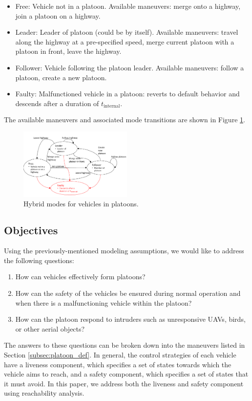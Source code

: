 \begin{itemize}
\item Free: Vehicle not in a platoon. Available maneuvers: merge onto a highway, join a platoon on a highway.
\item Leader: Leader of platoon (could be by itself). Available maneuvers: travel along the highway at a pre-specified speed, merge current platoon with a platoon in front, leave the highway.
\item Follower: Vehicle following the platoon leader. Available maneuvers: follow a platoon, create a new platoon.
\item Faulty: Malfunctioned vehicle in a platoon: reverts to default behavior and descends after a duration of $t_\text{internal}$.
\end{itemize}

The available maneuvers and associated mode transitions are shown in Figure \ref{fig:vehicleModes}.

\begin{figure}
	\centering
	\includegraphics[width=0.5\textwidth]{"fig/vehicleModes"}
	\caption{Hybrid modes for vehicles in platoons.}
	\label{fig:vehicleModes}
\end{figure}

\subsection{Objectives}
Using the previously-mentioned modeling assumptions, we would like to address the following questions:

\begin{enumerate}
\item How can vehicles effectively form platoons?
\item How can the safety of the vehicles be ensured during normal operation and when there is a malfunctioning vehicle within the platoon?
\item How can the platoon respond to intruders such as unresponsive UAVs, birds, or other aerial objects?
\end{enumerate}

The answers to these questions can be broken down into the maneuvers listed in Section \ref{subsec:platoon_def}. In general, the control strategies of each vehicle have a liveness component, which specifies a set of states towards which the vehicle aims to reach, and a safety component, which specifies a set of states that it must avoid. In this paper, we address both the liveness and safety component using reachability analysis.